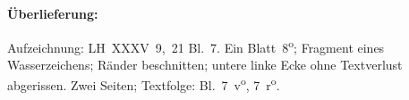 %  
%
%
%
%
%   
%
%
%
%
%
%
%
\frenchspacing
%
\begin{ledgroupsized}[r]{120mm}
\footnotesize
\pstart
\noindent\textbf{Überlieferung:}
\pend
\end{ledgroupsized}
%
\begin{ledgroupsized}[r]{114mm}
\footnotesize
\pstart \parindent -6mm
%
Aufzeichnung:
LH~XXXV~9,~21 Bl.~7. 
Ein Blatt~8\textsuperscript{o};
Fragment eines Wasserzeichens;
Ränder beschnitten;
untere linke Ecke ohne Textverlust abgerissen.
Zwei Seiten;
Textfolge: Bl.~7~v\textsuperscript{o}, 7~r\textsuperscript{o}.
\pend
\end{ledgroupsized}
%
%
\count{}%
\count{}%
\count{}
\vspace{5mm}
